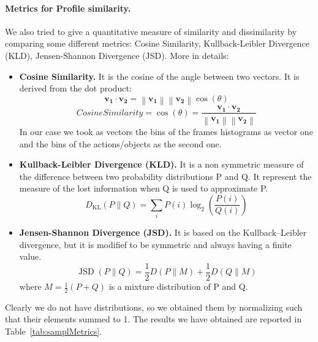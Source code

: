 \paragraph{Metrics for Profile similarity. }We also tried to give a quantitative measure of similarity and dissimilarity by comparing some 
different metrics: Cosine Similarity, Kullback-Leibler Divergence (KLD),
Jensen-Shannon Divergence (JSD).
More in details:
\begin{itemize}
    \item \textbf{Cosine Similarity.} It is the cosine of the angle between two vectors. It is derived from the dot product:  
    \begin{equation}
        \mathbf{v_{1}} \cdot \mathbf{v_{2}} =\left\lVert\mathbf{v_{1}} \right\rVert \left\lVert\mathbf{v_{2}} \right\rVert \cos(\theta) 
    \end{equation}
    \begin{equation}
        CosineSimilarity=\cos(\theta) = \frac{\mathbf{v_{1}} \cdot \mathbf{v_{2}} }{\left\lVert\mathbf{v_{1}} \right\rVert \left\lVert\mathbf{v_{2}} \right\rVert }
    \end{equation}
    In our case we took as vectors the bins of the frames histograms as vector one and the bins of the actions/objects as the second one.
    \item \textbf{Kullback-Leibler Divergence (KLD).} It is a non symmetric measure of the difference between two probability distributions
    P and Q. It represent the measure of the lost information when Q is used to approximate P.
    \begin{equation}
        D_{\mathrm{KL}}(P \| Q)=\sum_i P(i) \log _2\left(\frac{P(i)}{Q(i)}\right)
    \end{equation}
    \item \textbf{Jensen-Shannon Divergence (JSD).} It is based on the Kullback–Leibler divergence, but 
    it is modifief to be symmetric and always having a finite value.
    \begin{equation}
        \operatorname{JSD}(P \| Q)=\frac{1}{2} D(P \| M)+\frac{1}{2} D(Q \| M)
    \end{equation}
    where $M = \frac{1}{2}(P+Q)$ is a mixture distribution of P and Q.
\end{itemize}
Clearly we do not have distributions, so we obtained them by normalizing such that their elements summed to 1. The results we have obtained
are reported in Table~\ref{tab:samplMetrics}.


